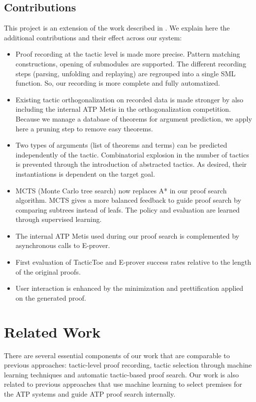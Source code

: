 \documentclass[runningheads,a4paper,draft]{svjour3}
\def\eprover{\textsf{E-prover}\xspace}
\def\sml{\textsf{SML}\xspace}
\def\metis{\textsf{Metis}\xspace}
\def\tactictoe{\textsf{TacticToe}\xspace}
\begin{document}
\subsection{Contributions}
This project is an extension of the work described in \cite{tgckju-lpar17}. We 
explain here the additional contributions and their effect across our system:

\begin{itemize}
\item Proof recording at the tactic level is made more precise. Pattern 
matching constructions, opening of submodules are supported. The different 
recording steps (parsing, unfolding and replaying) are regrouped into a single 
\sml function. So, our recording is more complete and fully automatized.
\item Existing tactic orthogonalization on recorded data is made stronger by 
also including the internal ATP \metis in the orthogonalization 
competition. Because we manage a database of theorems for argument 
prediction, we apply here a pruning step to remove easy theorems.
\item Two types of arguments (list of theorems and terms) can be predicted 
independently of the tactic. Combinatorial explosion in the number of tactics 
is prevented through the introduction of abstracted tactics. As desired, their 
instantiations is dependent on the target goal.
\item MCTS (Monte Carlo tree search) now replaces A* in our proof search 
algorithm. MCTS gives a more balanced feedback to guide proof search by 
comparing subtrees instead of leafs. The policy and evaluation are learned 
through supervised learning.
\item The internal ATP \metis used during our proof search is complemented by 
asynchronous calls to \eprover.
\item First evaluation of \tactictoe and \eprover success rates relative to 
the length of the original proofs.
\item User interaction is enhanced by the minimization and prettification 
applied on the generated proof.
\end{itemize}


\section{Related Work}
There are several essential components of our work that are comparable to 
previous approaches: tactic-level proof recording, tactic 
selection through machine learning techniques and automatic tactic-based proof 
search. Our work is also related to previous approaches that use machine 
learning to select premises for the ATP systems and guide ATP proof search 
internally.
\end{document}
